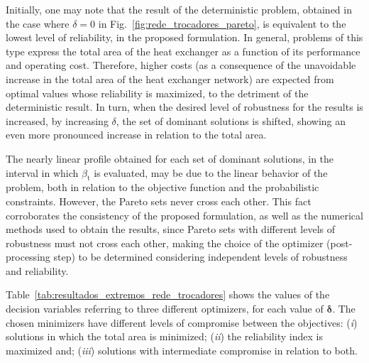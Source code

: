 \documentclass[final,5p,times,twocolumn,numbers]{elsarticle}
\newcommand{\vect}[1]{\mathbf{\boldsymbol{#1}}}
\begin{document}
Initially, one may note that the result of the deterministic problem, obtained in the case where $ \delta = 0 $ in Fig.~\ref{fig:rede_trocadores_pareto}, is equivalent to the lowest level of reliability, in the proposed formulation. In general, problems of this type express the total area of the heat exchanger as a function of its performance and operating cost. Therefore, higher costs (as a consequence of the unavoidable increase in the total area of the heat exchanger network) are expected from optimal values whose reliability is maximized, to the detriment of the deterministic result. In turn, when the desired level of robustness for the results is increased, by increasing $ \delta $, the set of dominant solutions is shifted, showing an even more pronounced increase in relation to the total area.

The nearly linear profile obtained for each set of dominant solutions, in the interval in which $ \beta_{\mathrm{t}} $ is evaluated, may be due to the linear behavior of the problem, both in relation to the objective function and the probabilistic constraints. However, the Pareto sets never cross each other. This fact corroborates the consistency of the proposed formulation, as well as the numerical methods used to obtain the results, since Pareto sets with different levels of robustness must not cross each other, making the choice of the optimizer (post-processing step) to be determined considering independent levels of robustness and reliability.

Table~\ref{tab:resultados_extremos_rede_trocadores} shows the values of the decision variables referring to three different optimizers, for each value of $ \vect{\delta} $. The chosen minimizers have different levels of compromise between the objectives: (\textit{i}) solutions in which the total area is minimized; (\textit{ii}) the reliability index is maximized and; (\textit{iii}) solutions with intermediate compromise in relation to both.
\end{document}
